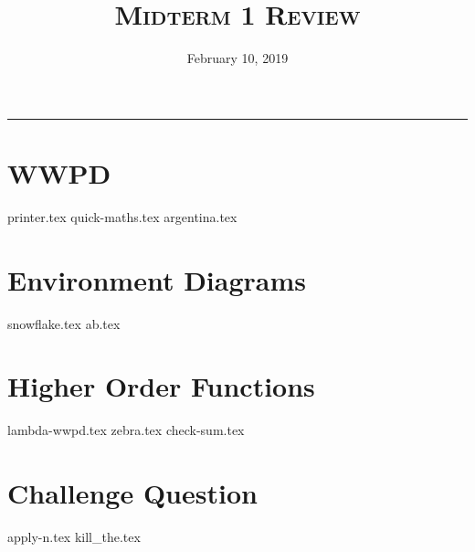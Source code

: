 \documentclass{exam}
\title{\textsc{Midterm 1 Review}}
\date{February 10, 2019}
\begin{document}
\maketitle
\rule{\textwidth}{0.15em}
\fontsize{12}{15}\selectfont


\section{WWPD}
\begin{questions}
{printer.tex}
{quick-maths.tex}
{argentina.tex}
\end{questions}

\newpage
\section{Environment Diagrams}
\begin{questions}
{snowflake.tex}
{ab.tex}

\end{questions}

\newpage
\section{Higher Order Functions}
\begin{questions}
{lambda-wwpd.tex}
{zebra.tex}
\newpage
{check-sum.tex}
\end{questions}


\section{Challenge Question}
\begin{questions}
{apply-n.tex}
{kill_the.tex}
\end{questions}
\end{document}
